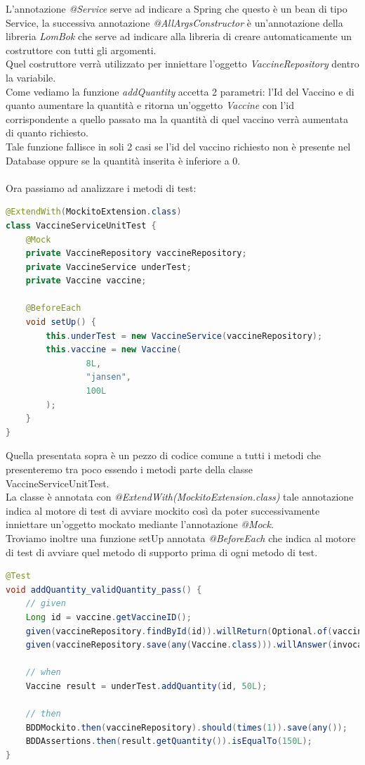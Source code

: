\documentclass[a4paper,12pt,openany,oneside]{book}
\begin{document}
L'annotazione \textit{@Service} serve ad indicare a Spring che questo è un bean di tipo Service, la successiva annotazione \textit{@AllArgsConstructor} è un'annotazione della libreria \textit{LomBok} che serve ad indicare alla libreria di creare automaticamente un costruttore con tutti gli argomenti.
\\Quel costruttore verrà utilizzato per inniettare l'oggetto \textit{VaccineRepository} dentro la variabile.\\
Come vediamo la funzione \textit{addQuantity} accetta 2 parametri: l'Id del Vaccino e di quanto aumentare la quantità e ritorna un'oggetto \textit{Vaccine} con l'id corrispondente a quello passato ma la quantità di quel vaccino verrà aumentata di quanto richiesto.\\
Tale funzione fallisce in soli 2 casi se l'id del vaccino richiesto non è presente nel Database oppure se la quantità inserita è inferiore a 0.\\
\\Ora passiamo ad analizzare i metodi di test:
\begin{lstlisting}[language=Java]
@ExtendWith(MockitoExtension.class)
class VaccineServiceUnitTest {
    @Mock
    private VaccineRepository vaccineRepository;
    private VaccineService underTest;
    private Vaccine vaccine;

    @BeforeEach
    void setUp() {
        this.underTest = new VaccineService(vaccineRepository);
        this.vaccine = new Vaccine(
                8L,
                "jansen",
                100L
        );
    }
}
\end{lstlisting}
Quella presentata sopra è un pezzo di codice comune a tutti i metodi che presenteremo tra poco essendo i metodi parte della classe VaccineServiceUnitTest.\\
La classe è annotata con \textit{@ExtendWith(MockitoExtension.class)} tale annotazione indica al motore di test di avviare mockito così da poter successivamente inniettare un'oggetto mockato mediante l'annotazione \textit{@Mock}.\\
Troviamo inoltre una funzione setUp annotata \textit{@BeforeEach} che indica al motore di test di avviare quel metodo di supporto prima di ogni metodo di test.\\
\begin{lstlisting}[language=Java]
@Test
void addQuantity_validQuantity_pass() {
    // given
    Long id = vaccine.getVaccineID();
    given(vaccineRepository.findById(id)).willReturn(Optional.of(vaccine));
    given(vaccineRepository.save(any(Vaccine.class))).willAnswer(invocationOnMock -> invocationOnMock.getArgument(0));

    // when
    Vaccine result = underTest.addQuantity(id, 50L);

    // then
    BDDMockito.then(vaccineRepository).should(times(1)).save(any());
    BDDAssertions.then(result.getQuantity()).isEqualTo(150L);
}
\end{lstlisting}
\end{document}
